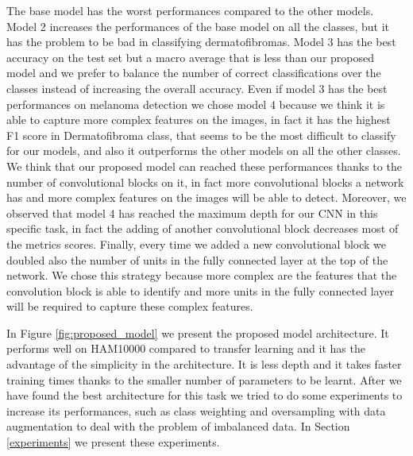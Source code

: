 		The base model has the worst performances compared to the other models. Model 2 increases the performances of the base model on all the classes, but it has the problem to be bad in classifying dermatofibromas.
		Model 3 has the best accuracy on the test set but a macro average that is less than our proposed model and we prefer to balance the number of correct classifications over the classes instead of increasing the overall accuracy. 
		Even if model 3 has the best performances on melanoma detection we chose model 4 because we think it is able to capture more complex features on the images, in fact it has the highest F1 score in Dermatofibroma class, that seems to be the most difficult to classify for our models, and also it outperforms the other models on all the other classes. We think that our proposed model can reached these performances thanks to the number of convolutional blocks on it, in fact more convolutional blocks a network has and more complex features on the images will be able to detect. Moreover, we observed that model 4 has reached the maximum depth for our CNN in this specific task, in fact the adding of another convolutional block decreases most of the metrics scores.
		Finally, every time we added a new convolutional block we doubled also the number of units in the fully connected layer at the top of the network. We chose this strategy because more complex are the features that the convolution block is able to identify and more units in the fully connected layer will be required to capture these complex features.
		
		In Figure \ref{fig:proposed_model} we present the proposed model architecture. It performs well on HAM10000 compared to transfer learning and it has the advantage of the simplicity in the architecture. It is less depth and it takes faster training times thanks to the smaller number of parameters to be learnt. 
		After we have found the best architecture for this task we tried to do some experiments to increase its performances, such as class weighting and oversampling with data augmentation to deal with the problem of imbalanced data. In Section \ref{experiments} we present these experiments.
		
